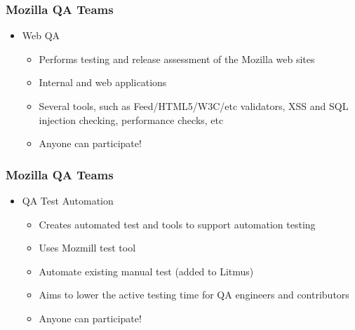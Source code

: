 \documentclass{beamer}
\begin{document}

\begin{frame}
\frametitle{Mozilla QA Teams}
 \begin{itemize}
 \item Web QA
      \begin{itemize}
      \item Performs testing and release assessment of the Mozilla web sites
      \item Internal and web applications
      \item Several tools, such as Feed/HTML5/W3C/etc validators, XSS and SQL injection checking, performance checks, etc
      \item Anyone can participate!
      \end{itemize}
 \end{itemize}
\end{frame}


\begin{frame}
\frametitle{Mozilla QA Teams}
 \begin{itemize}
 \item QA Test Automation
      \begin{itemize}
      \item Creates automated test and tools to support automation testing
      \item Uses Mozmill test tool
      \item Automate existing manual test (added to Litmus)
      \item Aims to lower the active testing time for QA engineers and contributors
      \item Anyone can participate!
      \end{itemize}
 \end{itemize}
\end{frame}

\end{document}
